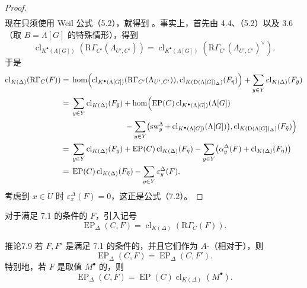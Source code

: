 \begin{proof}
\[\begin{aligned}
\end{aligned}
\]
现在只须使用 Weil 公式（5.2），就得到 。事实上，首先由 4.4、（5.2）以及 3.6（取 $B=\Lambda[G]$ 的特殊情形），得到
\[
\operatorname{cl}_{K^\bullet(\Lambda[G])}(\mathrm R\Gamma_{C'}(\Lambda_{U',C'}))
=\operatorname{cl}_{K^\bullet(\Lambda[G])}(\mathrm R\Gamma_{C'}(\Lambda_{U',C'})^\vee).
\]
于是
\[
\begin{aligned}
\operatorname{cl}_{K(\Delta)}(\mathrm R\Gamma_C(F))
={}&\operatorname{hom}\Bigl(
\operatorname{cl}_{K^\bullet(\Lambda[G])}(\mathrm R\Gamma_{C'}(\Lambda_{U',C'})),
\operatorname{cl}_{K(\mathrm D(\Lambda[G])_\Delta)}(F_{\bar\eta})\Bigr)
+\sum_{y\in Y}\operatorname{cl}_{K(\Delta)}(F_{\bar y})\\
={}&\sum_{y\in Y}\operatorname{cl}_{K(\Delta)}(F_{\bar y})
+\operatorname{hom}\Bigl(
\operatorname{EP}(C)\operatorname{cl}_{K^\bullet(\Lambda[G])}(\Lambda[G])\\
&\hspace{24mm}-\sum_{y\in Y}
\bigl(\operatorname{sw}_y^\Lambda+\operatorname{cl}_{K^\bullet(\Lambda[G])}(\Lambda[G])\bigr),
\operatorname{cl}_{K(\mathrm D(\Lambda[G])_\Delta)}(F_{\bar\eta})\Bigr)\\
={}&\sum_{y\in Y}\operatorname{cl}_{K(\Delta)}(F_{\bar y})
+\operatorname{EP}(C)\operatorname{cl}_{K(\Delta)}(F_{\bar\eta})
-\sum_{y\in Y}\bigl(\alpha_y^\Delta(F)+\operatorname{cl}_{K(\Delta)}(F_{\bar\eta})\bigr)\\
={}&\operatorname{EP}(C)\operatorname{cl}_{K(\Delta)}(F_{\bar\eta})
-\sum_{y\in Y}\varepsilon_y^\Delta(F).
\end{aligned}
\]
考虑到 $x\in U$ 时 $\varepsilon_x^\Delta(F)=0$，这正是公式（7.2）。
\end{proof}
对于满足 7.1 的条件的 $F$，引入记号
\[
\operatorname{EP}_\Delta(C,F)=\operatorname{cl}_{K(\Delta)}(\mathrm R\Gamma_C(F)).
\]

\begin{SGAresult}{推论}{7.9}
若 $F,F'$ 是满足 7.1 的条件的，并且它们作为 $A$-（相对于），则
\[
\operatorname{EP}_\Delta(C,F)=\operatorname{EP}_\Delta(C,F').\tag{7.10}
\]
特别地，若 $F$ 是取值 $M^\bullet$ 的，则
\[
\operatorname{EP}_\Delta(C,F)=\operatorname{EP}(C)\operatorname{cl}_{K(\Delta)}(M^\bullet).\tag{7.11}
\]
\end{SGAresult}

